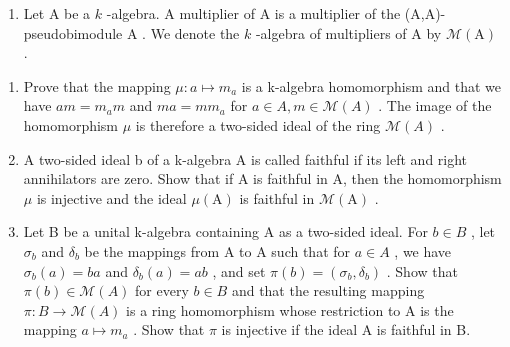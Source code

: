 \begin{enumerate}
\def\labelenumi{\arabic{enumi})}
\setcounter{enumi}{14}
\tightlist
\item
  Let \(\mathrm{A}\) be a \(k\) -algebra. A multiplier of \(\mathrm{A}\) is a multiplier of the (A,A)-pseudobimodule \(\mathrm{A}\) . We denote the \(k\) -algebra of multipliers of \(\mathrm{A}\) by \(\mathcal{M}(\mathrm{A})\) .
\end{enumerate}

\begin{enumerate}
\def\labelenumi{\alph{enumi})}
\item
  Prove that the mapping \(\mu: a \mapsto m_{a}\) is a k-algebra homomorphism and that we have \(am = m_{a}m\) and \(ma = mm_{a}\) for \(a \in A, m \in \mathcal{M}(A)\) . The image of the homomorphism \(\mu\) is therefore a two-sided ideal of the ring \(\mathcal{M}(A)\) .
\item
  A two-sided ideal b of a k-algebra A is called faithful if its left and right annihilators are zero. Show that if A is faithful in A, then the homomorphism \(\mu\) is injective and the ideal \(\mu(\mathrm{A})\) is faithful in \(\mathcal{M}(\mathrm{A})\) .
\item
  Let B be a unital k-algebra containing A as a two-sided ideal. For \(b \in B\) , let \(\sigma_{b}\) and \(\delta_{b}\) be the mappings from A to A such that for \(a \in A\) , we have \(\sigma_{b}(a) = ba\) and \(\delta_{b}(a) = ab\) , and set \(\pi(b) = (\sigma_{b}, \delta_{b})\) . Show that \(\pi(b) \in \mathcal{M}(A)\) for every \(b \in B\) and that the resulting mapping \(\pi : B \to \mathcal{M}(A)\) is a ring homomorphism whose restriction to A is the mapping \(a \mapsto m_{a}\) . Show that \(\pi\) is injective if the ideal A is faithful in B.
\end{enumerate}

